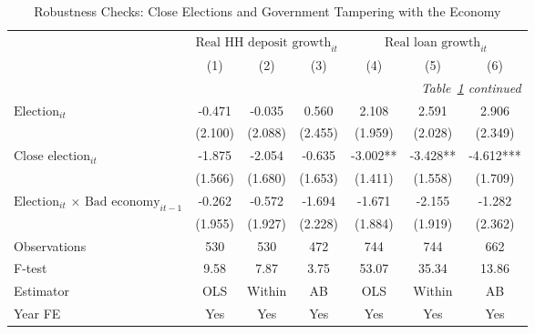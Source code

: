\begin{longtable}{m{5cm}*{6}{c}}                                         \caption{Robustness Checks: Close Elections and Government Tampering with the Economy\label{govtempce}}\\                                         \toprule                                         &\multicolumn{3}{c}{$\text{Real HH deposit growth}_{it}$} & \multicolumn{3}{c}{$\text{Real loan growth}_{it}$} \\ \cmidrule(lr){2-4} \cmidrule(lr){5-7}
                    &         (1)   &         (2)   &         (3)   &         (4)   &         (5)   &         (6)   \\
\midrule\endfirsthead                                         \multicolumn{7}{r}{\textit{Table~\ref{govtempce} continued}} \\                                         \toprule\endhead\midrule\endfoot\endlastfoot
$\text{Election}_{it}$&      -0.471   &      -0.035   &       0.560   &       2.108   &       2.591   &       2.906   \\
                    &     (2.100)   &     (2.088)   &     (2.455)   &     (1.959)   &     (2.028)   &     (2.349)   \\
\multirow{2}{4.5cm}{$\text{Close election}_{it}$}&      -1.875   &      -2.054   &      -0.635   &      -3.002** &      -3.428** &      -4.612***\\
                    &     (1.566)   &     (1.680)   &     (1.653)   &     (1.411)   &     (1.558)   &     (1.709)   \\
\multirow{2}{4.5cm}{$\text{Election}_{it}$ $\times$ $\text{Bad economy}_{it-1}$}&      -0.262   &      -0.572   &      -1.694   &      -1.671   &      -2.155   &      -1.282   \\
                    &     (1.955)   &     (1.927)   &     (2.228)   &     (1.884)   &     (1.919)   &     (2.362)   \\
\midrule
Observations        &         530   &         530   &         472   &         744   &         744   &         662   \\
F-test              &        9.58   &        7.87   &        3.75   &       53.07   &       35.34   &       13.86   \\
Estimator           &         OLS   &      Within   &          AB   &         OLS   &      Within   &          AB   \\
Year FE             &         Yes   &         Yes   &         Yes   &         Yes   &         Yes   &         Yes   \\

\end{longtable}
